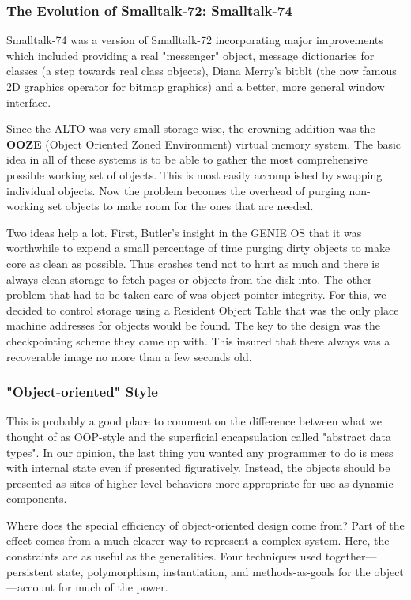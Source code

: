 \documentclass[letterpaper,12pt,parskip=full]{article}
\begin{document}
\subsubsection{The Evolution of Smalltalk-72: Smalltalk-74}

Smalltalk-74 was a version of Smalltalk-72 incorporating major improvements which included providing a real "messenger" object, message dictionaries for classes (a step towards real class objects), Diana Merry's bitblt (the now famous 2D graphics operator for bitmap graphics) and a better, more general window interface.

Since the ALTO was very small storage wise, the crowning addition was the \textbf{OOZE} (Object Oriented Zoned Environment) virtual memory system. The basic idea in all of these systems is to be able to gather the most comprehensive possible working set of objects. This is most easily accomplished by swapping individual objects. Now the problem becomes the overhead of purging non-working set objects to make room for the ones that are needed.

Two ideas help a lot. First, Butler's insight in the GENIE OS that it was worthwhile to expend a small percentage of time purging dirty objects to make core as clean as possible. Thus crashes tend not to hurt as much and there is always clean storage to fetch pages or objects from the disk into. The other problem that had to be taken care of was object-pointer integrity. For this, we decided to control storage using a Resident Object Table that was the only place machine addresses for objects would be found. The key to the design was the checkpointing scheme they came up with. This insured that there always was a recoverable image no more than a few seconds old.

\subsubsection{"Object-oriented" Style}

This is probably a good place to comment on the difference between what we thought of as OOP-style and the superficial encapsulation called "abstract data types". In our opinion, the last thing you wanted any programmer to do is mess with internal state even if presented figuratively. Instead, the objects should be presented as sites of higher level behaviors more appropriate for use as dynamic components.

Where does the special efficiency of object-oriented design come from?  Part of the effect comes from a much clearer way to represent a complex system. Here, the constraints are as useful as the generalities. Four techniques used together—persistent state, polymorphism, instantiation, and methods-as-goals for the object—account for much of the power.
\end{document}
